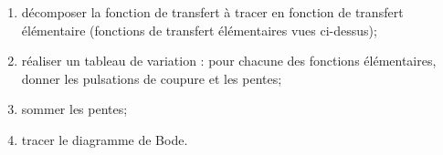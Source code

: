 \begin{methode}
\begin{enumerate}
\item décomposer la fonction de transfert à tracer en fonction de transfert élémentaire (fonctions de transfert élémentaires vues ci-dessus);
\item réaliser un tableau de variation : pour chacune des fonctions élémentaires, donner les pulsations de coupure et les pentes;
\item sommer les pentes;
\item tracer le diagramme de Bode.
\end{enumerate}
\end{methode}

